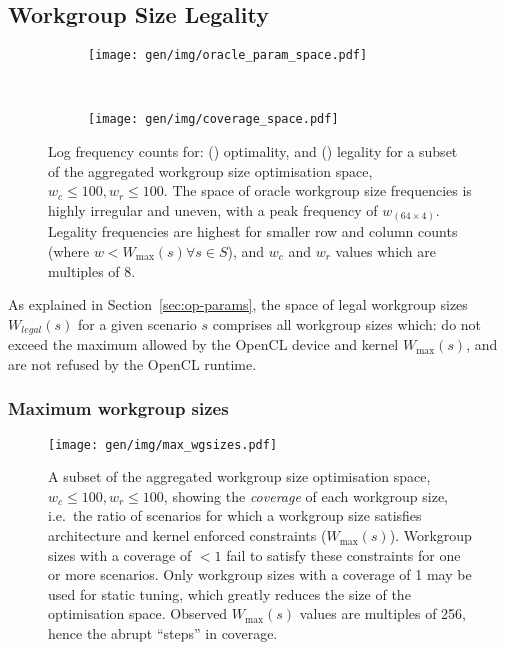 \subsection{Workgroup Size Legality}\label{subsec:legality}

\begin{figure}
\begin{subfigure}[t]{0.98\textwidth}
\centering
\texttt{[image: gen/img/oracle\_param\_space.pdf]}
\vspace{-1.5em} %
\caption{}
\label{fig:oracle-wgsizes}
\end{subfigure}
\\
\begin{subfigure}[t]{0.98\textwidth}
\centering
\texttt{[image: gen/img/coverage\_space.pdf]}
\vspace{-1.5em} %
\caption{}
\label{fig:coverage}
\end{subfigure}
\caption[Workgroup size legality and optimality]{%
  Log frequency counts for: () optimality,
  and () legality for a subset of the aggregated
  workgroup size optimisation space, $w_c \le 100, w_r \le 100$. The
  space of oracle workgroup size frequencies is highly irregular and
  uneven, with a peak frequency of $w_{(64 \times 4)}$. Legality
  frequencies are highest for smaller row and column counts (where
  $w < W_{\max}(s) \forall s \in S$), and $w_c$ and $w_r$ values which
  are multiples of 8.%
}
\label{fig:heatmaps}
\end{figure}

As explained in Section~\ref{sec:op-params}, the space of legal
workgroup sizes $W_{legal}(s)$ for a given scenario $s$ comprises all
workgroup sizes which: do not exceed the maximum allowed by the OpenCL
device and kernel $W_{\max}(s)$, and are not refused by the OpenCL
runtime.

\subsubsection{Maximum workgroup sizes}

\begin{figure}
  \centering
  \texttt{[image: gen/img/max\_wgsizes.pdf]}
  \vspace{-1.5em} %
  \caption[Workgroup size coverage]{%
    A subset of the aggregated workgroup size optimisation space,
    $w_c \le 100, w_r \le 100$, showing the \emph{coverage} of each
    workgroup size, i.e.\ the ratio of scenarios for which a workgroup
    size satisfies architecture and kernel enforced constraints
    ($W_{\max}(s)$). Workgroup sizes with a coverage of $< 1$ fail to
    satisfy these constraints for one or more scenarios. Only
    workgroup sizes with a coverage of 1 may be used for static
    tuning, which greatly reduces the size of the optimisation
    space. Observed $W_{\max}(s)$ values are multiples of 256, hence
    the abrupt ``steps'' in coverage.%
  }
\label{fig:max-wgsizes}
\end{figure}

